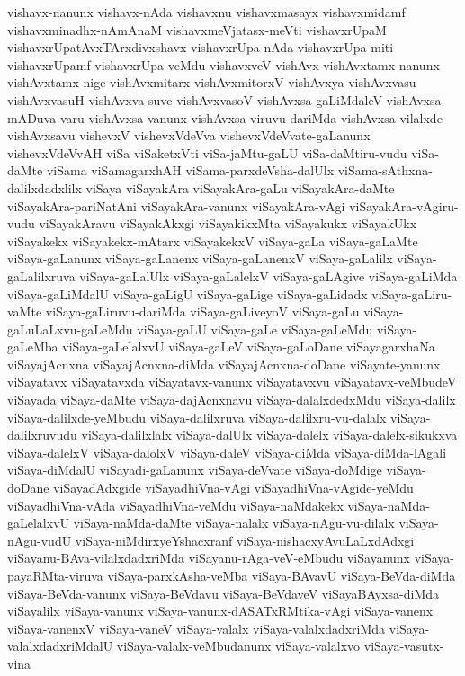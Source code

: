 {vishavx-nanunx
vishavx-nAda
vishavxnu
vishavxmasayx
vishavxmidamf
vishavxminadhx-nAmAnaM
vishavxmeVjatasx-meVti
vishavxrUpaM
vishavxrUpatAvxTArxdivxshavx
vishavxrUpa-nAda
vishavxrUpa-miti
vishavxrUpamf
vishavxrUpa-veMdu
vishavxveV
vishAvx
vishAvxtamx-nanunx
vishAvxtamx-nige
vishAvxmitarx
vishAvxmitorxV
vishAvxya
vishAvxvasu
vishAvxvasuH
vishAvxva-suve
vishAvxvasoV
vishAvxsa-gaLiMdaleV
vishAvxsa-mADuva-varu
vishAvxsa-vanunx
vishAvxsa-viruvu-dariMda
vishAvxsa-vilalxde
vishAvxsavu
vishevxV
vishevxVdeVva
vishevxVdeVvate-gaLanunx
vishevxVdeVvAH
viSa
viSaketxVti
viSa-jaMtu-gaLU
viSa-daMtiru-vudu
viSa-daMte
viSama
viSamagarxhAH
viSama-parxdeVsha-dalUlx
viSama-sAthxna-dalilxdadxlilx
viSaya
viSayakAra
viSayakAra-gaLu
viSayakAra-daMte
viSayakAra-pariNatAni
viSayakAra-vanunx
viSayakAra-vAgi
viSayakAra-vAgiru-vudu
viSayakAravu
viSayakAkxgi
viSayakikxMta
viSayakukx
viSayakUkx
viSayakekx
viSayakekx-mAtarx
viSayakekxV
viSaya-gaLa
viSaya-gaLaMte
viSaya-gaLanunx
viSaya-gaLanenx
viSaya-gaLanenxV
viSaya-gaLalilx
viSaya-gaLalilxruva
viSaya-gaLalUlx
viSaya-gaLalelxV
viSaya-gaLAgive
viSaya-gaLiMda
viSaya-gaLiMdalU
viSaya-gaLigU
viSaya-gaLige
viSaya-gaLidadx
viSaya-gaLiru-vaMte
viSaya-gaLiruvu-dariMda
viSaya-gaLiveyoV
viSaya-gaLu
viSaya-gaLuLaLxvu-gaLeMdu
viSaya-gaLU
viSaya-gaLe
viSaya-gaLeMdu
viSaya-gaLeMba
viSaya-gaLelalxvU
viSaya-gaLeV
viSaya-gaLoDane
viSayagarxhaNa
viSayajAcnxna
viSayajAcnxna-diMda
viSayajAcnxna-doDane
viSayate-yanunx
viSayatavx
viSayatavxda
viSayatavx-vanunx
viSayatavxvu
viSayatavx-veMbudeV
viSayada
viSaya-daMte
viSaya-dajAcnxnavu
viSaya-dalalxdedxMdu
viSaya-dalilx
viSaya-dalilxde-yeMbudu
viSaya-dalilxruva
viSaya-dalilxru-vu-dalalx
viSaya-dalilxruvudu
viSaya-dalilxlalx
viSaya-dalUlx
viSaya-dalelx
viSaya-dalelx-sikukxva
viSaya-dalelxV
viSaya-dalolxV
viSaya-daleV
viSaya-diMda
viSaya-diMda-lAgali
viSaya-diMdalU
viSayadi-gaLanunx
viSaya-deVvate
viSaya-doMdige
viSaya-doDane
viSayadAdxgide
viSayadhiVna-vAgi
viSayadhiVna-vAgide-yeMdu
viSayadhiVna-vAda
viSayadhiVna-veMdu
viSaya-naMdakekx
viSaya-naMda-gaLelalxvU
viSaya-naMda-daMte
viSaya-nalalx
viSaya-nAgu-vu-dilalx
viSaya-nAgu-vudU
viSaya-niMdirxyeYshacxranf
viSaya-nishacxyAvuLaLxdAdxgi
viSayanu-BAva-vilalxdadxriMda
viSayanu-rAga-veV-eMbudu
viSayanunx
viSaya-payaRMta-viruva
viSaya-parxkAsha-veMba
viSaya-BAvavU
viSaya-BeVda-diMda
viSaya-BeVda-vanunx
viSaya-BeVdavu
viSaya-BeVdaveV
viSayaBAyxsa-diMda
viSayalilx
viSaya-vanunx
viSaya-vanunx-dASATxRMtika-vAgi
viSaya-vanenx
viSaya-vanenxV
viSaya-vaneV
viSaya-valalx
viSaya-valalxdadxriMda
viSaya-valalxdadxriMdalU
viSaya-valalx-veMbudanunx
viSaya-valalxvo
viSaya-vasutx-vina
}

